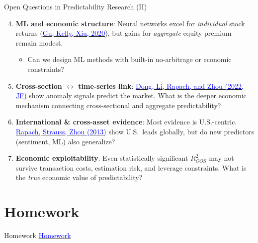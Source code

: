 \documentclass{beamer}
\begin{document}
\begin{frame}{Open Questions in Predictability Research (II)}
	\begin{enumerate}
		\setcounter{enumi}{3}
		\item \textbf{ML and economic structure}: Neural networks excel for \textit{individual} stock returns (\href{https://doi.org/10.1093/rfs/hhaa009}{\textcolor{blue}{Gu, Kelly, Xiu, 2020}}), but gains for \textit{aggregate} equity premium remain modest.
		\begin{itemize}
			\item Can we design ML methods with built-in no-arbitrage or economic constraints?
		\end{itemize}

		\vspace{3pt}
		\item \textbf{Cross-section $\leftrightarrow$ time-series link}: \href{https://doi.org/10.1111/jofi.13099}{\textcolor{blue}{Dong, Li, Rapach, and Zhou (2022, JF)}} show anomaly signals predict the market. What is the deeper economic mechanism connecting cross-sectional and aggregate predictability?

		\vspace{3pt}
		\item \textbf{International \& cross-asset evidence}: Most evidence is U.S.-centric. \href{https://doi.org/10.1016/j.jfineco.2012.05.008}{\textcolor{blue}{Rapach, Strauss, Zhou (2013)}} show U.S.\ leads globally, but do new predictors (sentiment, ML) also generalize?

		\vspace{3pt}
		\item \textbf{Economic exploitability}: Even statistically significant $R^2_{OOS}$ may not survive transaction costs, estimation risk, and leverage constraints. What is the \textit{true} economic value of predictability?
	\end{enumerate}
\end{frame}

\section{Homework}
\begin{frame}{Homework}
	\href{https://www.notion.so/betalpha/Homework-1-286428ff9d5c4a57be85da747da99f31}{\textcolor{blue}{Homework}}
\end{frame}
\end{document}
